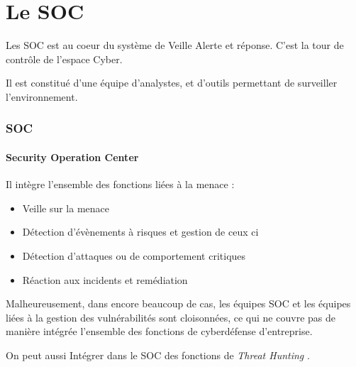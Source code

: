 
\section{Le SOC}

Les SOC est au coeur du système de Veille Alerte et réponse. C'est la tour de contrôle de l'espace Cyber.

Il est constitué d'une équipe d'analystes, et d'outils permettant de surveiller l'environnement.


\begin{frame}
\frametitle<presentation>{SOC}
\framesubtitle<presentation>{Security Operation Center}
Il intègre l'ensemble des fonctions liées à la menace :

\begin{itemize}
  \item Veille sur la menace
  \item Détection d'évènements à risques et gestion de ceux ci
  \item Détection d'attaques ou de comportement critiques
  \item Réaction aux incidents et remédiation

\end{itemize}
\end{frame}

Malheureusement, dans encore beaucoup de cas, les équipes SOC et les équipes liées à la gestion des vulnérabilités sont cloisonnées, ce qui ne couvre pas de manière intégrée l'ensemble des fonctions de cyberdéfense d'entreprise.

On peut aussi Intégrer dans  le SOC des fonctions de  \textit{Threat Hunting }.

